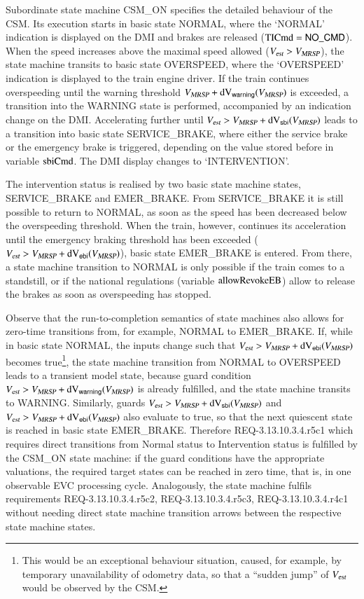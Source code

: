 Subordinate state machine {\sf CSM\_ON} specifies the detailed behaviour of the CSM. Its execution starts in basic state {\sf NORMAL}, where the `NORMAL' indication is displayed on the DMI and brakes are released ($\text{TICmd} = \mathsf{NO\_CMD}$). When the speed increases above the maximal speed allowed (${V_{\text{\sl est}}} > {V_{\text{\sl MRSP}}}$), the state machine transits to basic state {\sf OVERSPEED}, where the `OVERSPEED' indication is displayed to the train engine driver. If the train continues overspeeding until the warning threshold ${V_{\text{\sl MRSP}}} + \text{dV}_{\mathsf{warning}}({V_{\text{\sl MRSP}}})$ is exceeded, a transition
into the {\sf WARNING} state is performed, accompanied by an indication change on the DMI. Accelerating further until ${V_{\text{\sl est}}} > {V_{\text{\sl MRSP}}} + \text{dV}_{\mathsf{sbi}}({V_{\text{\sl MRSP}}})$ leads to a transition into basic state {\sf SERVICE\_BRAKE}, where either the service brake or the emergency brake is triggered, depending on the value stored before in variable $\text{sbiCmd}$. The DMI display changes to `INTERVENTION'. 

The intervention status is realised by two basic state machine states, {\sf SERVICE\_BRAKE} and
{\sf EMER\_BRAKE}. From {\sf SERVICE\_BRAKE} it is still possible to return to {\sf NORMAL}, as soon as the speed has been decreased below the overspeeding threshold. When the train, however, continues its acceleration until the emergency braking threshold has been exceeded (${V_{\text{\sl est}}} > {V_{\text{\sl MRSP}}}+\text{dV}_{\mathsf{ebi}}({V_{\text{\sl MRSP}}})$), basic state {\sf EMER\_BRAKE} is entered. From there, a state machine transition to {\sf NORMAL} is only possible if the train comes to a standstill, or if the national regulations (variable $\text{allowRevokeEB}$)
allow to release the brakes as soon as overspeeding has stopped.

Observe that the run-to-completion semantics of state machines also allows for zero-time
 transitions from, for example, {\sf NORMAL} to {\sf EMER\_BRAKE}. If,
 while in basic state {\sf NORMAL},  the inputs change such that
 ${V_{\text{\sl est}}} > {V_{\text{\sl MRSP}}}+\text{dV}_{\mathsf{ebi}}({V_{\text{\sl MRSP}}})$ becomes true\footnote{This would be an
   exceptional behaviour situation, caused, for example, by temporary
   unavailability of odometry data, so that a ``sudden jump'' of
   ${V_{\text{\sl est}}}$ would be observed by the CSM.}, the state machine
 transition from {\sf NORMAL} to {\sf OVERSPEED} leads to a transient
 model state, because guard condition ${V_{\text{\sl est}}} > {V_{\text{\sl MRSP}}}+\text{dV}_{\mathsf{warning}}({V_{\text{\sl MRSP}}})$ is already
 fulfilled, and the state machine transits to {\sf
   WARNING}. Similarly, guards ${V_{\text{\sl est}}} > {V_{\text{\sl MRSP}}}+\text{dV}_{\mathsf{sbi}}({V_{\text{\sl MRSP}}})$ and ${V_{\text{\sl est}}} >
 {V_{\text{\sl MRSP}}}+\text{dV}_{\mathsf{ebi}}({V_{\text{\sl MRSP}}})$ also evaluate to true, so that the next quiescent state
 is reached in basic state {\sf EMER\_BRAKE}.
  Therefore  REQ-3.13.10.3.4.r5c1  which requires direct transitions from Normal status to Intervention status 
is fulfilled by the {\sf CSM\_ON} state machine: if the guard conditions have the appropriate valuations, the required target states can be reached in zero time, that is, in one observable EVC processing cycle. Analogously, the state machine fulfils requirements 
REQ-3.13.10.3.4.r5c2, REQ-3.13.10.3.4.r5c3, REQ-3.13.10.3.4.r4c1
without needing direct state machine transition arrows between the respective state machine states.


